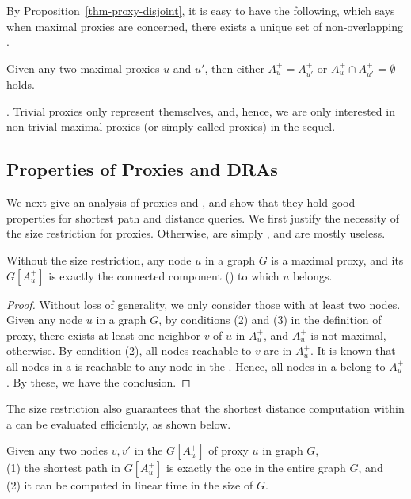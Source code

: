 By Proposition~\ref{thm-proxy-disjoint}, it is easy to have the following, which says when maximal proxies are concerned, there exists a unique set of non-overlapping \dras.

\begin{cor}
\label{cor-proxy-disjoint} Given any two maximal proxies $u$ and $u'$, then either $A^+_{u} = A^+_{u'}$ or $A^+_{u}\cap A^+_{u'}$ = $\emptyset$ holds.
\end{cor}

\vspace{-1ex}
. Trivial proxies only represent themselves, and, hence, we are only interested in non-trivial maximal proxies (or simply called proxies) in the sequel.


\subsection{Properties of Proxies and DRAs}
\label{subsec-proxy-properties}

We next give an analysis of proxies and \dras, and show that they hold good properties for shortest path and distance queries.
%
We first justify the necessity of the size restriction for proxies.  Otherwise, \dras are simply \ccs, and are mostly useless.


\begin{prop}
\label{prop-proxy-cc} Without the size restriction, any node $u$ in a graph $G$ is a maximal proxy,
and its \dra $G[A^+_u]$ is exactly the connected component (\cc) to which $u$ belongs.
\end{prop}

\begin{proof} Without loss of generality, we only consider those \ccs with at least two nodes.
Given any node $u$ in a graph $G$, by conditions (2) and (3) in the definition of proxy, there exists at least one neighbor $v$ of $u$ in $A^+_u$, and $A^+_u$ is not maximal, otherwise. By condition (2), all nodes reachable to $v$ are in $A^+_u$. It is known that all nodes in a \cc is reachable to any node in the \cc.
Hence, all nodes in a \cc belong to $A^+_u$. By these, we have the conclusion.
\end{proof}

The size restriction also guarantees that the shortest distance computation within a \dra can be evaluated efficiently,
as shown below.


\begin{prop}
\label{pro-proxy-path} Given any two nodes $v, v'$ in the \dra $G[A^+_u]$ of proxy $u$ in graph $G$, \\
(1) the shortest path in $G[A^+_u]$ is exactly the one in the entire graph $G$, and\\
(2) it can be computed in linear time in the size of $G$.
\end{prop}


